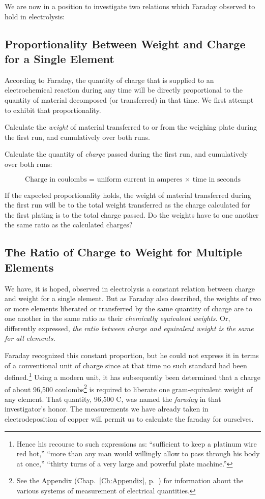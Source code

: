We are now in a position to investigate two relations which Faraday
observed to hold in electrolysis:

\subsection{Proportionality Between Weight and Charge for a Single Element}

According to Faraday, the quantity of charge that is supplied to an
electrochemical reaction during any time will be directly proportional
to the quantity of material de\-com\-posed (or transferred) in that time. We
first attempt to exhibit that proportionality.

Calculate the \emph{weight} of material transferred to or from the
weighing plate during the first run, and cumulatively over both runs.

Calculate the quantity of \emph{charge} passed during the first run, and
cumulatively over both runs:

\begin{equation*}
\text{Charge in coulombs = uniform current in amperes $\times$ time in seconds}
\end{equation*}

If the expected proportionality holds, the weight of material
transferred during the first run will be to the total weight transferred
as the charge calculated for the first plating is to the total charge
passed. Do the weights have to one another the same ratio as the
calculated charges?

\subsection{The Ratio of Charge to Weight for Multiple Elements}

We have, it is hoped, observed in electrolysis a constant relation
between charge and weight for a single element. But as Faraday also
described, the weights of two or more elements liberated or transferred
by the same quantity of charge are to one another in the same ratio as
their \emph{chemically equivalent weights}. Or, differently expressed,
\emph{the ratio between charge and equivalent weight is the same for all
elements.}

Faraday recognized this constant proportion, but he could not express it
in terms of a conventional unit of charge since at that time no such
standard had been defined.\footnote{Hence his recourse to such
  expressions as: ``sufficient to keep a platinum wire red hot,'' ``more
  than any man would willingly allow to pass through his body at once,''
  ``thirty turns of a very large and powerful plate machine.''} Using a
modern unit, it has subsequently been determined that a charge of about
96,500 coulombs\footnote{See the Appendix (Chap.~\ref{Ch:Appendix}, p.~\pageref{Ch:Appendix})
for information about the various systems of measurement of electrical quantities.} 
is required to liberate one gram-equivalent weight of any element. That
quantity, 96,500 C, was named the \emph{faraday} in that
investigator's honor. The mea\-sure\-ments we have already taken in
electrodeposition of copper will permit us to calculate the faraday for
ourselves.

